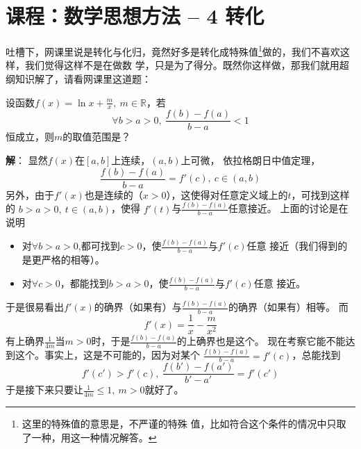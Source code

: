 \section{课程：数学思想方法 -- 4 转化}
吐槽下，网课里说是转化与化归，竟然好多是转化成特殊值\footnote{这里的特殊值的意思是，不严谨的特殊
值，比如符合这个条件的情况中只取了一种，用这一种情况解答。}做的，我们不喜欢这样，我们觉得这样不是在做数
学，只是为了得分。既然你这样做，那我们就用超纲知识解了，请看网课里这道题：

设函数\(f(x) = \ln{x} + \frac{m}{x},\ m \in \mathbb{R}\)，若
\[
\forall b > a > 0,\ \frac{f(b) - f(a)}{b - a} < 1
\]
恒成立，则$m$的取值范围是？

\textbf{解}：
显然$f(x)$在$[a,b]$上连续，$(a,b)$上可微，
依拉格朗日中值定理，
\begin{equation}
\frac{f(b) - f(a)}{b - a} = f'(c),\ c \in (a,b)
\end{equation}
另外，由于$f'(x)$也是连续的（$x>0$），这使得对任意定义域上的$t$，可找到这样的
$b > a > 0,\ t \in (a, b)$，使得
$f'(t)$与$\frac{f(b) - f(a)}{b - a}$任意接近。
上面的讨论是在说明
\begin{itemize}
\item 对$\forall b > a > 0$,都可找到$c>0$，使$\frac{f(b) - f(a)}{b - a}$与$f'(c)$任意
接近（我们得到的是更严格的相等）。
\item 对$\forall c>0$，都能找到$b > a > 0$，使$\frac{f(b) - f(a)}{b - a}$与$f'(c)$任意
接近。
\end{itemize}
于是很易看出$f'(x)$的确界（如果有）与$\frac{f(b) - f(a)}{b - a}$的确界（如果有）相等。
而
\begin{equation}
f'(x) = \frac{1}{x} - \frac{m}{x^2}
\end{equation}
有上确界$\frac{1}{4m}$当$m > 0$时，于是$\frac{f(b) - f(a)}{b - a}$的上确界也是这个。
现在考察它能不能达到这个。事实上，这是不可能的，因为对某个
$\frac{f(b) - f(a)}{b - a} = f'(c)$，总能找到
\begin{equation}
f'(c') > f'(c),\ \frac{f(b') - f(a')}{b' - a'} = f'(c')
\end{equation}
于是接下来只要让$\frac{1}{4m} \leq 1,\ m > 0$就好了。

